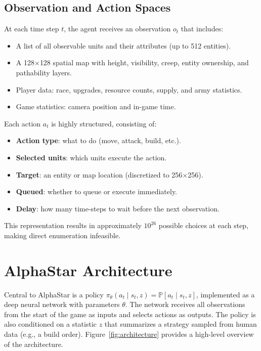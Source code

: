 \documentclass[11pt,a4paper]{article}
\begin{document}
\subsection{Observation and Action Spaces}

At each time step $t$, the agent receives an observation $o_t$ that includes:
\begin{itemize}[nosep]
    \item A list of all observable units and their attributes (up to 512 entities).
    \item A 128$\times$128 spatial map with height, visibility, creep, entity ownership, and pathability layers.
    \item Player data: race, upgrades, resource counts, supply, and army statistics.
    \item Game statistics: camera position and in-game time.
\end{itemize}

Each action $a_t$ is highly structured, consisting of:
\begin{itemize}[nosep]
    \item \textbf{Action type}: what to do (move, attack, build, etc.).
    \item \textbf{Selected units}: which units execute the action.
    \item \textbf{Target}: an entity or map location (discretized to 256$\times$256).
    \item \textbf{Queued}: whether to queue or execute immediately.
    \item \textbf{Delay}: how many time-steps to wait before the next observation.
\end{itemize}

This representation results in approximately $10^{26}$ possible choices at each step, making direct enumeration infeasible.

\section{AlphaStar Architecture}

Central to AlphaStar is a policy $\pi_\theta(a_t \mid s_t, z) = \mathbb{P}[a_t \mid s_t, z]$, implemented as a deep neural network with parameters $\theta$. The network receives all observations from the start of the game as inputs and selects actions as outputs. The policy is also conditioned on a statistic $z$ that summarizes a strategy sampled from human data (e.g., a build order). Figure~\ref{fig:architecture} provides a high-level overview of the architecture.
\end{document}
